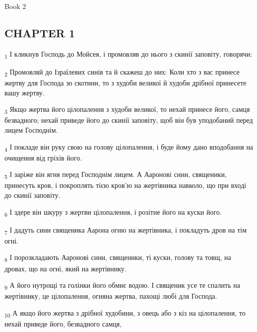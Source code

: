 Book 2
\subsection{CHAPTER 1}
\begin{tcolorbox}
\textsubscript{1} І кликнув Господь до Мойсея, і промовляв до нього з скинії заповіту, говорячи:
\end{tcolorbox}
\begin{tcolorbox}
\textsubscript{2} Промовляй до Ізраїлевих синів та й скажеш до них: Коли хто з вас принесе жертву для Господа зо скотини, то з худоби великої й худоби дрібної принесете вашу жертву.
\end{tcolorbox}
\begin{tcolorbox}
\textsubscript{3} Якщо жертва його цілопалення з худоби великої, то нехай принесе його, самця безвадного; нехай приведе його до скинії заповіту, щоб він був уподобаний перед лицем Господнім.
\end{tcolorbox}
\begin{tcolorbox}
\textsubscript{4} І покладе він руку свою на голову цілопалення, і буде йому дано вподобання на очищення від гріхів його.
\end{tcolorbox}
\begin{tcolorbox}
\textsubscript{5} І заріже він ягня перед Господнім лицем. А Ааронові сини, священики, принесуть кров, і покроплять тією кров'ю на жертівника навколо, що при вході до скинії заповіту.
\end{tcolorbox}
\begin{tcolorbox}
\textsubscript{6} І здере він шкуру з жертви цілопалення, і розітне його на куски його.
\end{tcolorbox}
\begin{tcolorbox}
\textsubscript{7} І дадуть сини священика Аарона огню на жертівника, і покладуть дров на тім огні.
\end{tcolorbox}
\begin{tcolorbox}
\textsubscript{8} І порозкладають Ааронові сини, священики, ті куски, голову та товщ, на дровах, що на огні, який на жертівнику.
\end{tcolorbox}
\begin{tcolorbox}
\textsubscript{9} А його нутрощі та голінки його обмиє водою. І священик усе те спалить на жертівнику, це цілопалення, огняна жертва, пахощі любі для Господа.
\end{tcolorbox}
\begin{tcolorbox}
\textsubscript{10} А якщо його жертва з дрібної худобини, з овець або з кіз на цілопалення, то нехай приведе його, безвадного самця,
\end{tcolorbox}
